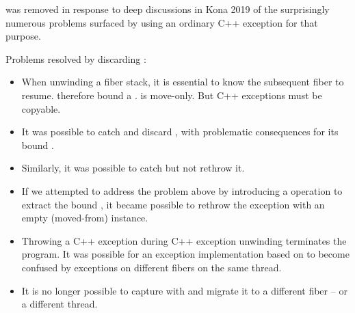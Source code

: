 \unwindex was removed in response to deep
discussions in Kona 2019 of the surprisingly numerous problems surfaced by
using an ordinary C++ exception for that purpose.

Problems resolved by discarding \unwindex:
\begin{itemize}
    \item When unwinding a fiber stack, it is essential to know the subsequent
          fiber to resume. \unwindex therefore bound a \fiber. \fiber is
          move-only. But C++ exceptions must be copyable.
    \item It was possible to catch and discard \unwindex, with problematic
          consequences for its bound \fiber.
    \item Similarly, it was possible to catch \unwindex but not rethrow it.
    \item If we attempted to address the problem above by introducing a
          \unwindex operation to extract the bound \fiber, it became possible
          to rethrow the exception with an empty (moved-from) \fiber instance.
    \item Throwing a C++ exception during C++ exception unwinding terminates
          the program. It was possible for an exception implementation based
          on  to become confused by exceptions on different
          fibers on the same thread.
    \item It is no longer possible to capture \unwindex with
           and migrate it to a different fiber -- or
          a different thread.
\end{itemize}
